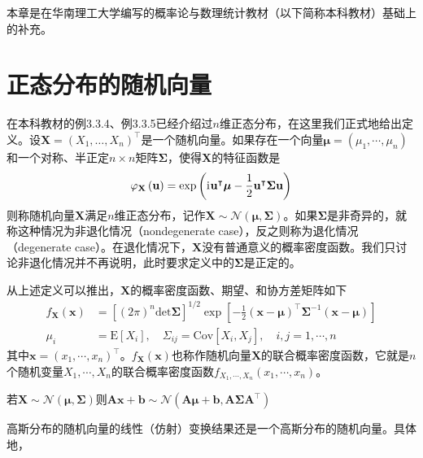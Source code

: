 \documentclass[main.tex]{subfiles}
\begin{document}
本章是在华南理工大学编写的概率论与数理统计教材\cite{何春雄2012}（以下简称本科教材）基础上的补充。



\section{正态分布的随机向量}
在本科教材的例3.3.4、例3.3.5已经介绍过$n$维正态分布，在这里我们正式地给出定义。设$\mathbf{X}=\left(X_1,\dots,X_n\right)^\intercal$是一个随机向量。如果存在一个向量$\boldsymbol{\mu}=\left(\mu_1,\cdots,\mu_n\right)$和一个对称、半正定$n\times n$矩阵$\boldsymbol{\Sigma}$，使得$\mathbf{X}$的特征函数是
\[\varphi_{\mathbf{X}}\left(\mathbf{u}\right)=\exp\left(\mathrm{i}\mkern1mu\mathbf{u}^\intercal\boldsymbol{\mu}-\frac{1}{2}\mathbf{u}^\intercal\boldsymbol{\Sigma}\mathbf{u}\right)\]
则称随机向量$\mathbf{X}$满足$n$维正态分布，记作$\mathbf{X}\sim\mathcal{N}\left(\boldsymbol{\mu},\boldsymbol{\Sigma}\right)$。如果$\boldsymbol{\Sigma}$是非奇异的，就称这种情况为非退化情况（nondegenerate case），反之则称为退化情况（degenerate case）。在退化情况下，$\mathbf{X}$没有普通意义的概率密度函数。我们只讨论非退化情况并不再说明，此时要求定义中的$\boldsymbol{\Sigma}$是正定的。

从上述定义可以推出，$\mathbf{X}$的概率密度函数、期望、和协方差矩阵如下
\begin{align*}
    f_\mathbf{X}\left(\mathbf{x}\right) & =\left[\left(2 \pi\right)^n\mathrm{det}\boldsymbol{\Sigma}\right]^{1/2}\exp\left[-\frac{1}{2}\left(\mathbf{x}-\boldsymbol{\mu}\right)^\intercal\boldsymbol{\Sigma}^{-1}\left(\mathbf{x}-\boldsymbol{\mu}\right)\right] \\
    \mu_i                               & =\mathrm{E}\left[X_i\right],\quad \Sigma_{ij}=\mathrm{Cov}\left[X_i,X_j\right],\quad i,j=1,\cdots,n
\end{align*}
其中$\mathbf{x}=\left(x_1,\cdots,x_n\right)^\intercal$。$f_\mathbf{X}\left(\mathbf{x}\right)$也称作随机向量$\mathbf{X}$的联合概率密度函数，它就是$n$个随机变量$X_1,\cdots,X_n$的联合概率密度函数$f_{X_1,\cdots,X_n}\left(x_1,\cdots,x_n\right)$。


\begin{theorem}
    若$\mathbf{X}\sim\mathcal{N}\left(\boldsymbol{\mu},\boldsymbol{\Sigma}\right)$则$\mathbf{Ax}+\mathbf{b}\sim\mathcal{N}\left(\mathbf{A}\boldsymbol{\mu}+\mathbf{b},\mathbf{A}\boldsymbol{\Sigma}\mathbf{A}^\intercal\right)$
\end{theorem}


高斯分布的随机向量的线性（仿射）变换结果还是一个高斯分布的随机向量。具体地，
\end{document}
